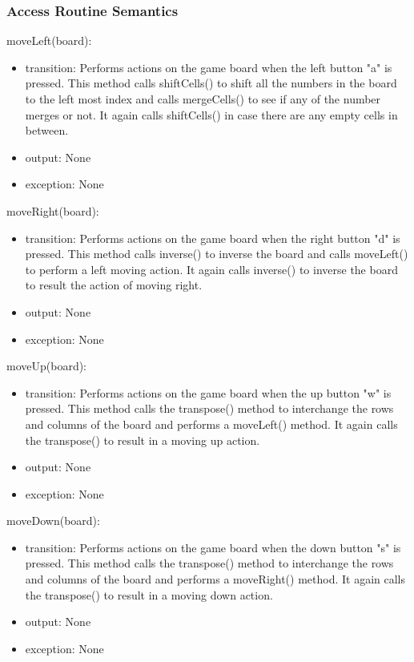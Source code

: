 \documentclass[12pt]{article}
\begin{document}
\subsubsection* {Access Routine Semantics}

moveLeft(board):
\begin{itemize}
    \item transition: Performs actions on the game board when the left button "a" is pressed. This method calls shiftCells() to shift all the numbers in the board to the left most index and calls mergeCells() to see if any of the number merges or not. It again calls shiftCells() in case there are any empty cells in between.
    \item output: None
    \item exception: None
\end{itemize}

\noindent moveRight(board):
\begin{itemize}
    \item transition: Performs actions on the game board when the right button "d" is pressed. This method calls inverse() to inverse the board and calls moveLeft() to perform a left moving action. It again calls inverse() to inverse the board to result the action of moving right.
    \item output: None
    \item exception: None
\end{itemize}

\noindent moveUp(board):
\begin{itemize}
    \item transition: Performs actions on the game board when the up button "w" is pressed. This method calls the transpose() method to interchange the rows and columns of the board and performs a moveLeft() method. It again calls the transpose() to result in a moving up action.
    \item output: None
    \item exception: None
\end{itemize}

\noindent moveDown(board):
\begin{itemize}
    \item transition: Performs actions on the game board when the down button "s" is pressed. This method calls the transpose() method to interchange the rows and columns of the board and performs a moveRight() method. It again calls the transpose() to result in a moving down action.
    \item output: None
    \item exception: None
\end{itemize}
\end{document}
